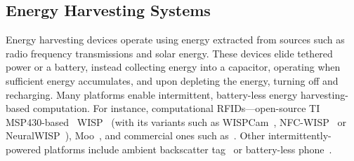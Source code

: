 
\subsection{Energy Harvesting Systems}
\label{sec:background_harvesting}

Energy harvesting devices operate using energy extracted from sources such as radio frequency transmissions and solar energy. These devices elide tethered power or a battery, instead collecting energy into a capacitor, operating when sufficient energy accumulates, and upon depleting the energy, turning off and recharging.
%
%
%
Many platforms enable intermittent, battery-less energy harvesting-based computation. For instance, computational RFIDs---open-source TI MSP430-based~\cite{wolverine} WISP~\cite{wisp5} (with its variants such as WISPCam~\cite{naderiparizi_rfid_2015}, NFC-WISP~\cite{zhao_rfid_2015} or NeuralWISP~\cite{holleman_biocas_2008}), Moo~\cite{moo}, and commercial ones such as~\cite{medusa_farsens_2017}. Other intermittently-powered platforms include ambient backscatter tag~\cite{liu_sigcomm_2013,parks_sigcomm_2014} or battery-less phone~\cite{talla_imwut_2017}. 

